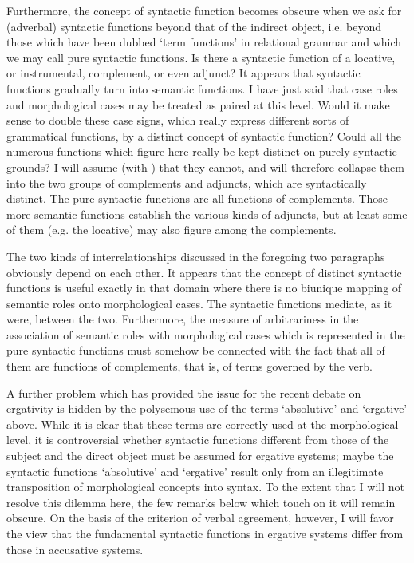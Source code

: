 Furthermore, the concept of syntactic function becomes obscure when we ask for (adverbal) syntactic functions beyond that of the indirect object, i.e. beyond those which have been dubbed ‘term functions’ in relational grammar and which we may call pure syntactic functions. Is there a syntactic function of a locative, or instrumental, complement, or even adjunct? It appears that syntactic functions gradually turn into semantic functions. I have just said that case roles and morphological cases may be treated as paired at this level. Would it make sense to double these case signs, which really express different sorts of grammatical functions, by a distinct concept of syntactic function? Could all the numerous functions which figure here really be kept distinct on purely syntactic grounds? I will assume (with \citealt[17--21]{Matthews1981}) that they cannot, and will therefore collapse them into the two groups of complements and adjuncts, which are syntactically distinct. The pure syntactic functions are all functions of complements. Those more semantic functions establish the various kinds of adjuncts, but at least some of them (e.g. the locative) may also figure among the complements.

The two kinds of interrelationships discussed in the foregoing two paragraphs obviously depend on each other. It appears that the concept of distinct syntactic functions is useful exactly in that domain where there is no biunique mapping of semantic roles onto morphological cases. The syntactic functions mediate, as it were, between the two. Furthermore, the measure of arbitrariness in the association of semantic roles with morphological cases which is represented in the pure syntactic functions must somehow be connected with the fact that all of them are functions of complements, that is, of terms governed by the verb.

A further problem which has provided the issue for the recent debate on ergativity is hidden by the polysemous use of the terms ‘absolutive’ and ‘ergative’ above. While it is clear that these terms are correctly used at the morphological level, it is controversial whether syntactic functions different from those of the subject and the direct object must be assumed for ergative systems; maybe the syntactic functions ‘absolutive’ and ‘ergative’ result only from an illegitimate transposition of morphological concepts into syntax. To the extent that I will not resolve this dilemma here, the few remarks below which touch on it will remain obscure. On the basis of the criterion of verbal agreement, however, I will favor the view that the fundamental syntactic functions in ergative systems differ from those in accusative systems.

